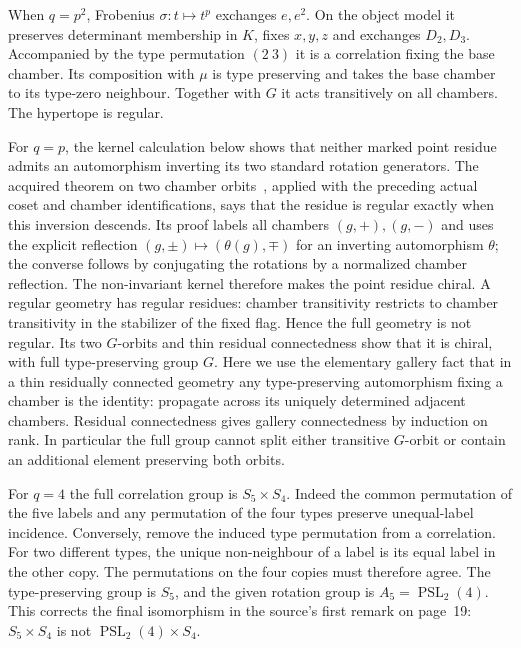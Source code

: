 When $q=p^2$, Frobenius $\sigma:t\mapsto t^p$ exchanges $e,e^2$.
On the object model it preserves determinant membership in $K$,
fixes $x,y,z$ and exchanges $D_2,D_3$. Accompanied by the type
permutation $(2\ 3)$ it is a correlation fixing the base chamber.
Its composition with $\mu$ is type preserving and takes the base
chamber to its type-zero neighbour. Together with $G$ it acts
transitively on all chambers. The hypertope is regular.

For $q=p$, the kernel calculation below shows that neither
marked point residue admits an automorphism inverting its two
standard rotation generators. The acquired theorem on two chamber
orbits~\cite{reflection}, applied with the preceding actual
coset and chamber identifications, says that the residue is
regular exactly when this inversion descends. Its proof labels
all chambers $(g,+),(g,-)$ and uses the explicit reflection
$(g,\pm)\mapsto(\theta(g),\mp)$ for an inverting automorphism
$\theta$; the converse follows by conjugating the rotations
by a normalized chamber reflection. The non-invariant kernel
therefore makes the point residue chiral.
A regular geometry has regular residues:
chamber transitivity restricts to chamber transitivity in the
stabilizer of the fixed flag. Hence the full geometry is not
regular. Its two $G$-orbits and thin residual connectedness show
that it is chiral, with full type-preserving group $G$.
Here we use the elementary gallery fact that in a thin residually
connected geometry any type-preserving automorphism fixing a
chamber is the identity: propagate across its uniquely determined
adjacent chambers. Residual connectedness gives gallery
connectedness by induction on rank. In particular the full group
cannot split either transitive $G$-orbit or contain an additional
element preserving both orbits.

For $q=4$ the full correlation group is $S_5\times S_4$.
Indeed the common permutation of the five labels and any
permutation of the four types preserve unequal-label incidence.
Conversely, remove the induced type permutation from a correlation.
For two different types, the unique non-neighbour of a label is
its equal label in the other copy. The permutations on the four
copies must therefore agree. The type-preserving group is $S_5$,
and the given rotation group is $A_5=\operatorname{PSL}_2(4)$.
This corrects the final isomorphism in the source's first remark
on page~19: $S_5\times S_4$ is not
$\operatorname{PSL}_2(4)\times S_4$.
